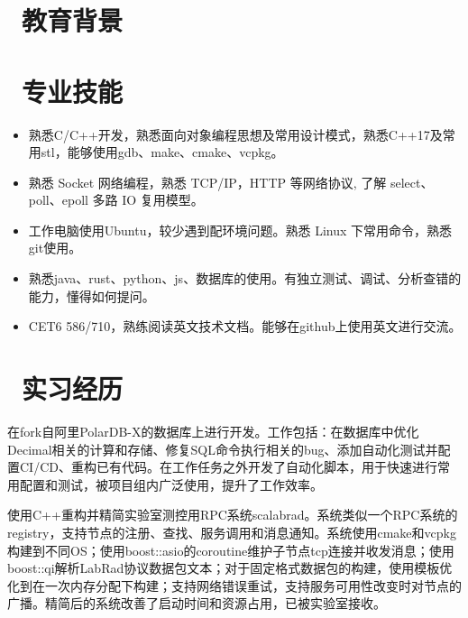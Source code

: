 \documentclass{resume}
\begin{document}



\section{\faGraduationCap\  教育背景}


\section{\faBook\ 专业技能}
\begin{itemize}[parsep=0.5ex]
  \item 熟悉C/C++开发，熟悉面向对象编程思想及常用设计模式，熟悉C++17及常用stl，能够使用gdb、make、cmake、vcpkg。
  \item 熟悉 Socket 网络编程，熟悉 TCP/IP，HTTP 等网络协议, 了解 select、poll、epoll 多路 IO 复用模型。
  \item 工作电脑使用Ubuntu，较少遇到配环境问题。熟悉 Linux 下常用命令，熟悉git使用。
  \item 熟悉java、rust、python、js、数据库的使用。有独立测试、调试、分析查错的能力，懂得如何提问。
  \item CET6 586/710，熟练阅读英文技术文档。能够在github上使用英文进行交流。
\end{itemize}

\section{\faUsers\ 实习经历}
\begin{onehalfspacing}
  在fork自阿里PolarDB-X的数据库上进行开发。工作包括：在数据库中优化Decimal相关的计算和存储、修复SQL命令执行相关的bug、添加自动化测试并配置CI/CD、重构已有代码。在工作任务之外开发了自动化脚本，用于快速进行常用配置和测试，被项目组内广泛使用，提升了工作效率。
\end{onehalfspacing}

\begin{onehalfspacing}
  使用C++重构并精简实验室测控用RPC系统scalabrad。系统类似一个RPC系统的registry，支持节点的注册、查找、服务调用和消息通知。系统使用cmake和vcpkg构建到不同OS；使用boost::asio的coroutine维护子节点tcp连接并收发消息；使用boost::qi解析LabRad协议数据包文本；对于固定格式数据包的构建，使用模板优化到在一次内存分配下构建；支持网络错误重试，支持服务可用性改变时对节点的广播。精简后的系统改善了启动时间和资源占用，已被实验室接收。
\end{onehalfspacing}
\end{document}
